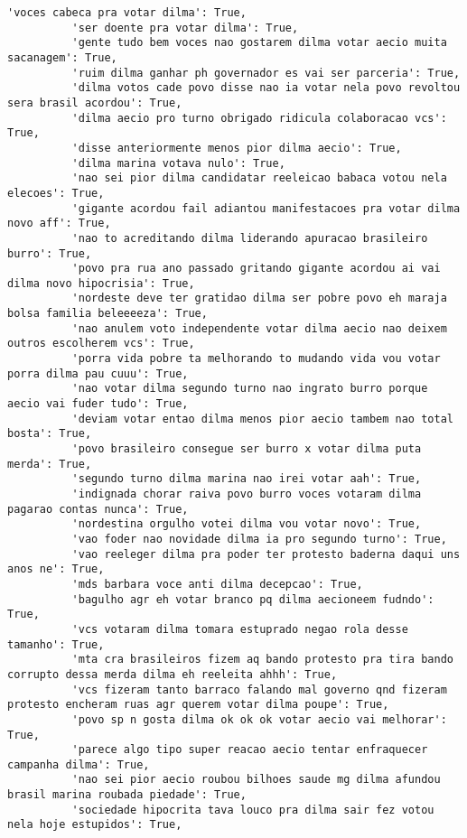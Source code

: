 \documentclass[11pt]{article}
\begin{document}
\begin{Verbatim}[commandchars=\\\{\}]
          'voces cabeca pra votar dilma': True,
          'ser doente pra votar dilma': True,
          'gente tudo bem voces nao gostarem dilma votar aecio muita sacanagem': True,
          'ruim dilma ganhar ph governador es vai ser parceria': True,
          'dilma votos cade povo disse nao ia votar nela povo revoltou sera brasil acordou': True,
          'dilma aecio pro turno obrigado ridicula colaboracao vcs': True,
          'disse anteriormente menos pior dilma aecio': True,
          'dilma marina votava nulo': True,
          'nao sei pior dilma candidatar reeleicao babaca votou nela elecoes': True,
          'gigante acordou fail adiantou manifestacoes pra votar dilma novo aff': True,
          'nao to acreditando dilma liderando apuracao brasileiro burro': True,
          'povo pra rua ano passado gritando gigante acordou ai vai dilma novo hipocrisia': True,
          'nordeste deve ter gratidao dilma ser pobre povo eh maraja bolsa familia beleeeeza': True,
          'nao anulem voto independente votar dilma aecio nao deixem outros escolherem vcs': True,
          'porra vida pobre ta melhorando to mudando vida vou votar porra dilma pau cuuu': True,
          'nao votar dilma segundo turno nao ingrato burro porque aecio vai fuder tudo': True,
          'deviam votar entao dilma menos pior aecio tambem nao total bosta': True,
          'povo brasileiro consegue ser burro x votar dilma puta merda': True,
          'segundo turno dilma marina nao irei votar aah': True,
          'indignada chorar raiva povo burro voces votaram dilma pagarao contas nunca': True,
          'nordestina orgulho votei dilma vou votar novo': True,
          'vao foder nao novidade dilma ia pro segundo turno': True,
          'vao reeleger dilma pra poder ter protesto baderna daqui uns anos ne': True,
          'mds barbara voce anti dilma decepcao': True,
          'bagulho agr eh votar branco pq dilma aecioneem fudndo': True,
          'vcs votaram dilma tomara estuprado negao rola desse tamanho': True,
          'mta cra brasileiros fizem aq bando protesto pra tira bando corrupto dessa merda dilma eh reeleita ahhh': True,
          'vcs fizeram tanto barraco falando mal governo qnd fizeram protesto encheram ruas agr querem votar dilma poupe': True,
          'povo sp n gosta dilma ok ok ok votar aecio vai melhorar': True,
          'parece algo tipo super reacao aecio tentar enfraquecer campanha dilma': True,
          'nao sei pior aecio roubou bilhoes saude mg dilma afundou brasil marina roubada piedade': True,
          'sociedade hipocrita tava louco pra dilma sair fez votou nela hoje estupidos': True,

\end{Verbatim}
\end{document}
